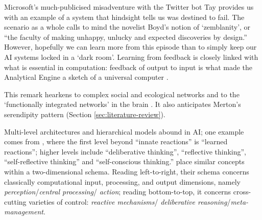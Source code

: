 Microsoft's
much-publicised misadventure with the Twitter bot {\sf Tay}
\cite{wolf2017we} provides us with an example of a system that
hindsight tells us was destined to fail.  The scenario as a whole
calls to mind the novelist Boyd's \cite[p.~211]{boyd2010armadillo}
notion of `zemblanity', or ``the faculty of making unhappy, unlucky
and expected discoveries by design.''  However, hopefully we can learn
more from this episode than to simply keep our AI systems locked in a
`dark room'.
Learning from feedback is closely linked with what is essential in
computation: feedback of output to input is what made the Analytical
Engine a sketch of a universal computer \cite[p.~24]{Webb1980}.

This remark hearkens to complex social and ecological networks and to
the `functionally integrated networks' in the brain \cite{Pessoa2017}.
It also anticipates Merton's serendipity pattern (Section
\ref{sec:literature-review}).
 



Multi-level architectures and hierarchical models abound in AI; one
example comes from \citet{singh2005architecture}, where the first
level beyond ``innate reactions'' is ``learned reactions''; higher
levels include ``deliberative thinking'', ``reflective thinking'',
``self-reflective thinking'' and ``self-conscious thinking.''
\citet{sloman2002framework} place similar concepts within a
two-dimensional schema.  Reading left-to-right, their schema concerns
classically computational input, processing, and output dimensions,
namely \emph{perception}\slash \emph{central processing}\slash
\emph{action}; reading bottom-to-top, it concerns cross-cutting
varieties of control: \emph{reactive mechanisms}\slash
\emph{deliberative reasoning}\slash \emph{meta-management}.

